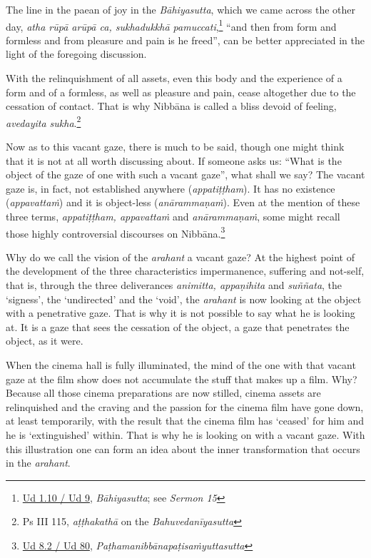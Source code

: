 The line in the paean of joy in the \emph{Bāhiyasutta}, which we came across the other day, \emph{atha rūpā arūpā ca, sukhadukkhā pamuccati},\footnote{\href{https://suttacentral.net/ud1.10/pli/ms}{Ud 1.10 / Ud 9}, \emph{Bāhiyasutta}; see \emph{Sermon 15}} ``and then from form and formless and from pleasure and pain is he freed'', can be better appreciated in the light of the foregoing discussion.

With the relinquishment of all assets, even this body and the experience of a form and of a formless, as well as pleasure and pain, cease altogether due to the cessation of contact. That is why Nibbāna is called a bliss devoid of feeling, \emph{avedayita sukha}.\footnote{Ps III 115, \emph{aṭṭhakathā} on the \emph{Bahuvedanīyasutta}}

Now as to this vacant gaze, there is much to be said, though one might think that it is not at all worth discussing about. If someone asks us: ``What is the object of the gaze of one with such a vacant gaze'', what shall we say? The vacant gaze is, in fact, not established anywhere (\emph{appatiṭṭham}). It has no existence (\emph{appavattaṁ}) and it is object-less (\emph{anārammaṇaṁ}). Even at the mention of these three terms, \emph{appatiṭṭham, appavattaṁ} and \emph{anārammaṇaṁ}, some might recall those highly controversial discourses on Nibbāna.\footnote{\href{https://suttacentral.net/ud8.2/pli/ms}{Ud 8.2 / Ud 80}, \emph{Paṭhamanibbānapaṭisaṁyuttasutta}}

Why do we call the vision of the \emph{arahant} a vacant gaze? At the highest point of the development of the three characteristics impermanence, suffering and not-self, that is, through the three deliverances \emph{animitta, appaṇihita} and \emph{suññata}, the `signess', the `undirected' and the `void', the \emph{arahant} is now looking at the object with a penetrative gaze. That is why it is not possible to say what he is looking at. It is a gaze that sees the cessation of the object, a gaze that penetrates the object, as it were.

When the cinema hall is fully illuminated, the mind of the one with that vacant gaze at the film show does not accumulate the stuff that makes up a film. Why? Because all those cinema preparations are now stilled, cinema assets are relinquished and the craving and the passion for the cinema film have gone down, at least temporarily, with the result that the cinema film has `ceased' for him and he is `extinguished' within. That is why he is looking on with a vacant gaze. With this illustration one can form an idea about the inner transformation that occurs in the \emph{arahant}.

